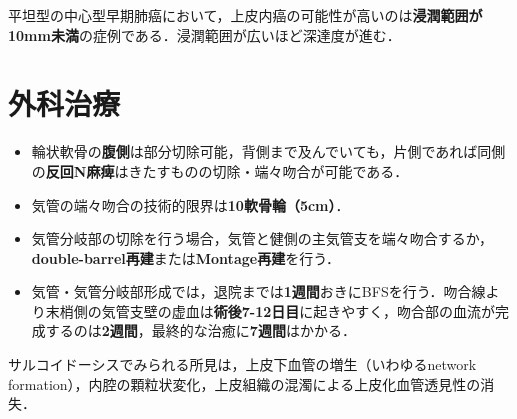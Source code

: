 平坦型の中心型早期肺癌において，上皮内癌の可能性が高いのは\textbf{浸潤範囲が10mm未満}の症例である．浸潤範囲が広いほど深達度が進む．

\newpage
\section{外科治療}

\begin{itemize}

\item 輪状軟骨の\textbf{腹側}は部分切除可能，背側まで及んでいても，片側であれば同側の\textbf{反回N麻痺}はきたすものの切除・端々吻合が可能である．
\item 気管の端々吻合の技術的限界は\textbf{10軟骨輪（5cm）}．
\item 気管分岐部の切除を行う場合，気管と健側の主気管支を端々吻合するか，\textbf{double-barrel再建}または\textbf{Montage再建}を行う．
\item 気管・気管分岐部形成では，退院までは\textbf{1週間}おきにBFSを行う．吻合線より末梢側の気管支壁の虚血は\textbf{術後7-12日目}に起きやすく，吻合部の血流が完成するのは\textbf{2週間}，最終的な治癒に\textbf{7週間}はかかる．

\end{itemize}

サルコイドーシスでみられる所見は，上皮下血管の増生（いわゆるnetwork formation），内腔の顆粒状変化，上皮組織の混濁による上皮化血管透見性の消失．

